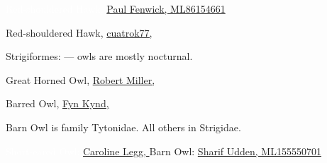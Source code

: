 \documentclass[t]{beamer}
\begin{document}
{
\begin{frame}


\tinyfill \textcolor{white}{Red-shouldered Hawk, \href{https://macaulaylibrary.org/asset/86154661}{Paul Fenwick, ML86154661}}
\end{frame}
}

{
\begin{frame}


\tinyfill Red-shouldered Hawk, \href{https://flickr.com/photos/cuatrok77/8535844534}{cuatrok77, }
\end{frame}
}


{
\begin{frame}{Strigiformes:  — owls are mostly nocturnal.}


\vfilll 



\tiny \colorbox[gray]{0.9}{\parbox{0.3\textwidth}{Great Horned Owl,  \href{https://flickr.com/photos/12463666@N03/32547241817}{Robert Miller, }}}
 \hfill Barred Owl, \href{https://flickr.com/photos/79452129@N02/30833383633}{Fyn Kynd, }
\end{frame}
}


{

\begin{frame}{Barn Owl is family Tytonidae. All others in Strigidae.}



\vfilll

\tiny \textcolor{white}{Short-eared Owl: \href{https://flickr.com/photos/128941223@N02/49978078296}{Caroline Legg, }} \hfill Barn Owl: \href{https://macaulaylibrary.org/asset/155550701}{Sharif Udden, ML155550701}
\end{frame}
}
\end{document}
